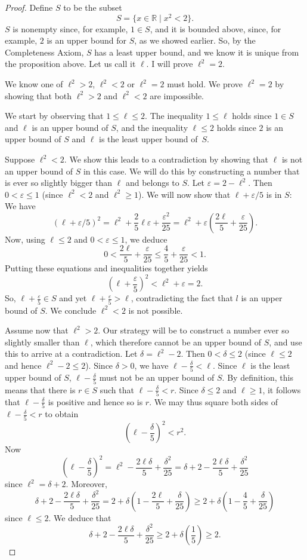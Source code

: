 \documentclass[12pt]{amsart}
\def\d{\delta}
\def\e{\varepsilon}
\newcommand{\R}{{\mathbb{R}}}
\numberwithin{equation}{section}
\theoremstyle{plain} %
\theoremstyle{definition}
\theoremstyle{remark}
\begin{document}
\begin{proof} 
Define $S$ to be the subset 
$$
S = \{x \in \R \mid x^2 < 2\}.
$$
$S$ is nonempty since, for example, $1 \in S$, and it is bounded above, since, for example, 
$2$ is an upper bound for $S$, as we showed earlier.  So, by the Completeness Axiom, $S$ has a least upper bound, and we know it is unique from
  the proposition above. Let us call it $\ell$. I will prove $\ell^2 = 2$. 

We know one of $\ell^2 > 2$, $\ell^2 < 2$ or $\ell^2 = 2$ must hold. We prove $\ell^2 = 2$ by showing that both
$\ell^2 > 2$ and $\ell^2 < 2$ are impossible.

We start by observing that $1 \leq \ell \leq 2$. The inequality $1 \leq \ell$ holds since $1 \in S$ and $\ell$ is an upper bound of $S$, 
and the inequality $\ell \leq 2$ holds  since $2$ is an upper bound of $S$ and $\ell$ is the least upper bound of~$S$.


Suppose $\ell^2 < 2$. We show this leads to a contradiction by showing that $\ell$ is not an upper bound of $S$ in this case. We will do this by constructing a number
that is ever so slightly bigger than $\ell$ and  belongs to $S$. 
Let $\e = 2 - \ell^2$. Then $0 < \e \leq 1$ (since $\ell^2 < 2$ and $\ell^2 \geq 1$).  
We will now show that $\ell + \e/5$ is in $S$: We have
$$
(\ell + \e/5)^2 = \ell^2 + \frac25 \ell\e + \frac{\e^2}{25} = \ell^2 + \e(\frac{2\ell}{5} + \frac{\e}{25}).
$$
Now, using $\ell \leq 2$ and $0 < \e \leq 1$, we deduce
$$
0 < \frac{2\ell}{5} + \frac{\e}{25} \leq \frac45 + \frac{\e}{25} < 1.
$$
Putting these equations and inequalities  together yields
$$
(\ell + \frac{\e}{5})^2 < \ell^2 + \e = 2.
$$
So, $\ell + \frac{\e}{5} \in S$ and yet $\ell + \frac{\e}{5} > \ell$, contradicting the fact that $l$ is an upper bound of $S$. We conclude $\ell^2 < 2$ is not
possible.

Assume now that $\ell^2 > 2$. Our strategy will be to construct a number ever so slightly smaller than $\ell$, which therefore cannot be an upper bound of $S$, and use this to
arrive at a contradiction. 
Let $\d = \ell^2 - 2$. Then $0 < \d \leq 2$ (since $\ell \leq 2$ and hence $\ell^2 - 2 \leq 2$).
Since $\d > 0$, we have $\ell - \frac{\d}{5} < \ell$. Since $\ell$ is the least upper bound of $S$, $\ell- \frac{\d}{5}$ must not be an upper bound of $S$. By definition, this means that there is $r \in S$ such that 
$\ell - \frac{\d}{5} < r$. Since $\d \leq 2$ and $\ell \geq 1$, it follows that $\ell - \frac{\d}{5}$ is positive and hence so is $r$. We may thus square both sides of 
$\ell - \frac{\d}{5} < r$ to obtain
$$
(\ell - \frac{\d}{5})^2 < r^2.
$$
Now
$$
(\ell - \frac{\d}{5})^2 = \ell^2 - \frac{2\ell\d}{5} + \frac{\d^2}{25} = \d + 2 - \frac{2\ell\d}{5} + \frac{\d^2}{25}
$$
since $\ell^2 = \d + 2$.
Moreover, 
$$
\d + 2 - \frac{2\ell\d}{5} + \frac{\d^2}{25}
= 2 + \d(1 - \frac{2\ell}{5} + \frac{\d}{25})
\geq 2 + \d(1 - \frac{4}{5} + \frac{\d}{25})
$$
since $\ell \leq 2$. We deduce that 
$$
\d + 2 - \frac{2\ell\d}{5} + \frac{\d^2}{25}
\geq 2 + \d(\frac{1}{5}) \geq 2. 
$$


\end{proof}
\end{document}
